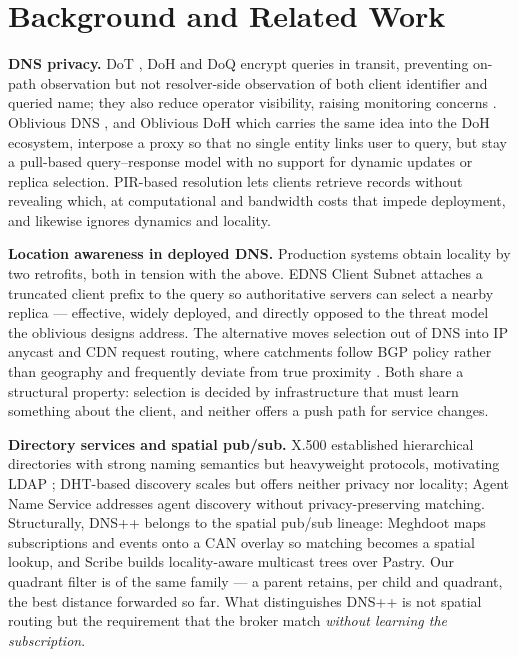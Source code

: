 \documentclass[10pt]{article}
\begin{document}
\section{Background and Related Work}
\label{sec:related}

\textbf{DNS privacy.} DoT \citep{hu2016dot}, DoH \citep{hoffman2018doh} and DoQ \citep{huitema2022doq} encrypt queries in transit, preventing on-path observation but not resolver-side observation of both client identifier and queried name; they also reduce operator visibility, raising monitoring concerns \citep{hynek2023encrypted}. Oblivious DNS \citep{schmitt2019odoh}, and Oblivious DoH \citep{singanamalla2021odoh} which carries the same idea into the DoH ecosystem, interpose a proxy so that no single entity links user to query, but stay a pull-based query--response model with no support for dynamic updates or replica selection. PIR-based resolution \citep{chor1998pir, bhat2019pir, papadopoulos2020pir} lets clients retrieve records without revealing which, at computational and bandwidth costs that impede deployment, and likewise ignores dynamics and locality.

\textbf{Location awareness in deployed DNS.} Production systems obtain locality by two retrofits, both in tension with the above. EDNS Client Subnet \citep{contavalli2016ecs} attaches a truncated client prefix to the query so authoritative servers can select a nearby replica --- effective, widely deployed, and directly opposed to the threat model the oblivious designs address. The alternative moves selection out of DNS into IP anycast and CDN request routing, where catchments follow BGP policy rather than geography and frequently deviate from true proximity \citep{calder2015anycast}. Both share a structural property: selection is decided by infrastructure that must learn something about the client, and neither offers a push path for service changes.

\textbf{Directory services and spatial pub/sub.} X.500 \citep{chadwick1994x500} established hierarchical directories with strong naming semantics but heavyweight protocols, motivating LDAP \citep{sermersheim2006ldap}; DHT-based discovery \citep{ratnasamy2001can, kurte2024decentralised} scales but offers neither privacy nor locality; Agent Name Service \citep{habler2025ans} addresses agent discovery without privacy-preserving matching. Structurally, DNS++ belongs to the spatial pub/sub lineage: Meghdoot \citep{gupta2004meghdoot} maps subscriptions and events onto a CAN overlay so matching becomes a spatial lookup, and Scribe \citep{castro2002scribe} builds locality-aware multicast trees over Pastry. Our quadrant filter is of the same family --- a parent retains, per child and quadrant, the best distance forwarded so far. What distinguishes DNS++ is not spatial routing but the requirement that the broker match \emph{without learning the subscription}.
\end{document}
